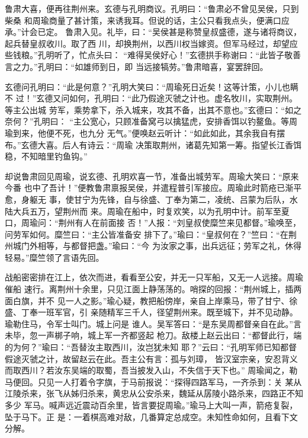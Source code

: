 鲁肃大喜，便再往荆州来。玄德与孔明商议。孔明曰：“鲁肃必不曾见吴侯，只到柴桑
和周瑜商量了甚计策，来诱我耳。但说的话，主公只看我点头，便满口应承。”计会已定。
鲁肃入见。礼毕，曰：“吴侯甚是称赞皇叔盛德，遂与诸将商议，起兵替皇叔收川。取了西
川，却换荆州，以西川权当嫁资。但军马经过，却望应些钱粮。”孔明听了，忙点头曰：
“难得吴侯好心！”玄德拱手称谢曰：“此皆子敬善言之力。”孔明曰：“如雄师到日，即
当远接犒劳。”鲁肃暗喜，宴罢辞回。

玄德问孔明曰：“此是何意？”孔明大笑曰：“周瑜死日近矣！这等计策，小儿也瞒不
过！”玄德又问如何，孔明曰：“此乃假途灭虢之计也。虚名牧川，实取荆州。等主公出城
劳军，乘势拿下，杀入城来，攻其不备，出其不意也。”玄德曰：“如之奈何？”孔明曰：
“主公宽心，只顾准备窝弓以擒猛虎，安排香饵以钓鳌鱼。等周瑜到来，他便不死，也九分
无气。”便唤赵云听计：“如此如此，其余我自有摆布。”玄德大喜。后人有诗云：“周瑜
决策取荆州，诸葛先知第一筹。指望长江香饵稳，不知暗里钓鱼钩。”

却说鲁肃回见周瑜，说玄德、孔明欢喜一节，准备出城劳军。周瑜大笑曰：“原来今番
也中了吾计！”便教鲁肃禀报吴侯，并遣程普引军接应。周瑜此时箭疮已渐平愈，身躯无
事，使甘宁为先锋，自与徐盛、丁奉为第二，凌统、吕蒙为后队，水陆大兵五万，望荆州而
来。周瑜在船中，时复欢笑，以为孔明中计。前军至夏口，周瑜问：“荆州有人在前面接
否！”人报：“刘皇叔使糜竺来见都督。”瑜唤至，问劳军如何。糜竺曰：“主公皆准备安
排下了。”瑜曰：“皇叔何在？”竺曰：“在荆州城门外相等，与都督把盏。”瑜曰：“今
为汝家之事，出兵远征；劳军之礼，休得轻易。”糜竺领了言语先回。

战船密密排在江上，依次而进，看看至公安，并无一只军船，又无一人远接。周瑜催船
速行。离荆州十余里，只见江面上静荡荡的。哨探的回报：“荆州城上，插两面白旗，并不
见一人之影。”瑜心疑，教把船傍岸，亲自上岸乘马，带了甘宁、徐盛、丁奉一班军官，引
亲随精军三千人，径望荆州来。既至城下，并不见动静。瑜勒住马，令军士叫门。城上问是
谁人。吴军答曰：“是东吴周都督亲自在此。”言未毕，忽一声梆子响，城上军一齐都竖起
枪刀。敌楼上赵云出曰：“都督此行，端的为何？”瑜曰：“吾替汝主取西川，汝岂犹未知
耶？”云曰：“孔明军师已知都督假途灭虢之计，故留赵云在此。吾主公有言：孤与刘璋，
皆汉室宗亲，安忍背义而取西川？若汝东吴端的取蜀，吾当披发入山，不失信于天下也。”
周瑜闻之，勒马便回。只见一人打着令字旗，于马前报说：“探得四路军马，一齐杀到：关
某从江陵杀来，张飞从姊归杀来，黄忠从公安杀来，魏延从孱陵小路杀来，四路正不知多少
军马。喊声远近震动百余里，皆言要捉周瑜。”瑜马上大叫一声，箭疮复裂，坠于马下。正
是：一着棋高难对敌，几番算定总成空。未知性命如何，且看下文分解。